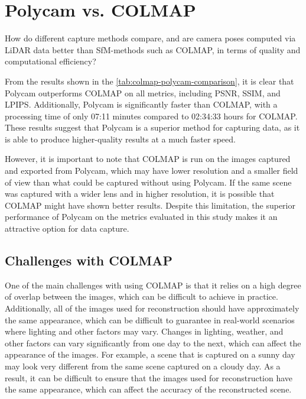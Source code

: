 \section{Polycam vs. COLMAP}
\begin{description}[leftmargin=!,labelwidth=\widthof{RQ 1:}]
\item[\textbf{RQ 3:}]
How do different capture methods compare, and are camera poses computed via LiDAR data better than SfM-methods such as COLMAP, in terms of quality and computational efficiency?
\end{description}


From the results shown in the \autoref{tab:colmap-polycam-comparison}, it is clear that Polycam outperforms COLMAP on all metrics, including PSNR, SSIM, and LPIPS. Additionally, Polycam is significantly faster than COLMAP, with a processing time of only 07:11 minutes compared to 02:34:33 hours for COLMAP. These results suggest that Polycam is a superior method for capturing data, as it is able to produce higher-quality results at a much faster speed.

However, it is important to note that COLMAP is run on the images captured and exported from Polycam, which may have lower resolution and a smaller field of view than what could be captured without using Polycam. If the same scene was captured with a wider lens and in higher resolution, it is possible that COLMAP might have shown better results. Despite this limitation, the superior performance of Polycam on the metrics evaluated in this study makes it an attractive option for data capture.

\subsection{Challenges with COLMAP}
One of the main challenges with using COLMAP is that it relies on a high degree of overlap between the images, which can be difficult to achieve in practice. Additionally, all of the images used for reconstruction should have approximately the same appearance, which can be difficult to guarantee in real-world scenarios where lighting and other factors may vary. Changes in lighting, weather, and other factors can vary significantly from one day to the next, which can affect the appearance of the images. For example, a scene that is captured on a sunny day may look very different from the same scene captured on a cloudy day. As a result, it can be difficult to ensure that the images used for reconstruction have the same appearance, which can affect the accuracy of the reconstructed scene.

